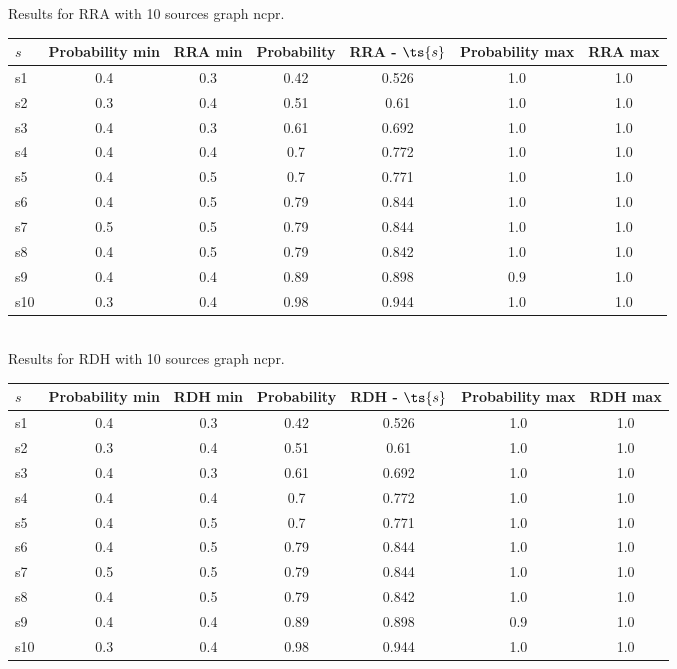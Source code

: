 \documentclass{article}
\begin{document}
\noindent Results for RRA with 10 sources graph ncpr.

\noindent\begin{tabular}{|l|c|c|c|c|c|c|}
\hline
$s$& Probability min & RRA min & Probability & RRA - $\ts{s}$ & Probability max & RRA max\\
\hline
s1 &0.4 & 0.3 & 0.42 & 0.526 & 1.0 & 1.0\\
\hline
s2 &0.3 & 0.4 & 0.51 & 0.61 & 1.0 & 1.0\\
\hline
s3 &0.4 & 0.3 & 0.61 & 0.692 & 1.0 & 1.0\\
\hline
s4 &0.4 & 0.4 & 0.7 & 0.772 & 1.0 & 1.0\\
\hline
s5 &0.4 & 0.5 & 0.7 & 0.771 & 1.0 & 1.0\\
\hline
s6 &0.4 & 0.5 & 0.79 & 0.844 & 1.0 & 1.0\\
\hline
s7 &0.5 & 0.5 & 0.79 & 0.844 & 1.0 & 1.0\\
\hline
s8 &0.4 & 0.5 & 0.79 & 0.842 & 1.0 & 1.0\\
\hline
s9 &0.4 & 0.4 & 0.89 & 0.898 & 0.9 & 1.0\\
\hline
s10 &0.3 & 0.4 & 0.98 & 0.944 & 1.0 & 1.0\\
\hline
\end{tabular}\\

\noindent Results for RDH with 10 sources graph ncpr.

\noindent\begin{tabular}{|l|c|c|c|c|c|c|}
\hline
$s$& Probability min & RDH min & Probability & RDH - $\ts{s}$ & Probability max & RDH max\\
\hline
s1 &0.4 & 0.3 & 0.42 & 0.526 & 1.0 & 1.0\\
\hline
s2 &0.3 & 0.4 & 0.51 & 0.61 & 1.0 & 1.0\\
\hline
s3 &0.4 & 0.3 & 0.61 & 0.692 & 1.0 & 1.0\\
\hline
s4 &0.4 & 0.4 & 0.7 & 0.772 & 1.0 & 1.0\\
\hline
s5 &0.4 & 0.5 & 0.7 & 0.771 & 1.0 & 1.0\\
\hline
s6 &0.4 & 0.5 & 0.79 & 0.844 & 1.0 & 1.0\\
\hline
s7 &0.5 & 0.5 & 0.79 & 0.844 & 1.0 & 1.0\\
\hline
s8 &0.4 & 0.5 & 0.79 & 0.842 & 1.0 & 1.0\\
\hline
s9 &0.4 & 0.4 & 0.89 & 0.898 & 0.9 & 1.0\\
\hline
s10 &0.3 & 0.4 & 0.98 & 0.944 & 1.0 & 1.0\\
\hline
\end{tabular}\\
\end{document}
